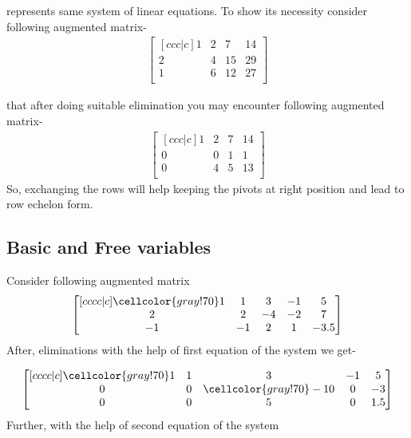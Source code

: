 \documentclass{article}
\newcommand\bg{\cellcolor{gray!70}} %
\begin{document}
\) represents same system of linear equations. To show its necessity consider following augmented matrix-
\begin{align}
\begin{bmatrix}[ccc|c] 
1 & 2 & 7 & 14 \\
2 & 4 & 15 & 29 \\
1 & 6 & 12 & 27 \\
\end{bmatrix}\nonumber
\end{align}

that after doing suitable elimination you may encounter following augmented matrix-\\
\begin{align}
\begin{bmatrix}[ccc|c] 
1 & 2 & 7 & 14 \\
0 & 0 & 1 & 1 \\
0 & 4 & 5 & 13 \\
\end{bmatrix}\nonumber
\end{align}
So, exchanging the rows will help keeping the pivots at right position and lead to row echelon form.\\

\subsection{Basic and Free variables}
Consider following augmented matrix
\begin{align}
\begin{bmatrix}[cccc|c] 
 \bg1 & 1 & 3 & -1 & 5 \\
2 & 2 & -4 & -2 & 7 \\
-1 & -1 & 2 & 1 & -3.5 
\end{bmatrix}\nonumber
\end{align}
After, eliminations with the help of first equation of the system we get-

\begin{align}
\begin{bmatrix}[cccc|c] 
 \bg1 & 1 & 3 & -1 & 5 \\
0 & 0 & \bg-10 & 0 & -3 \\
0 & 0 & 5 & 0 & 1.5 
\end{bmatrix}\nonumber
\end{align}
Further, with the help of second equation of the system
\end{document}
